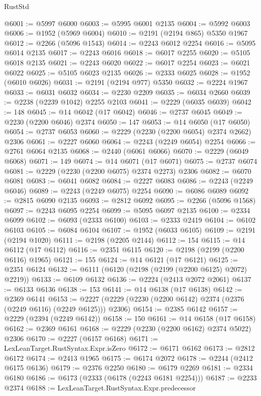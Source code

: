 \begin{lexlean}{RustStd}
\begin{coremodule}
@6001 := @5997 @6000
@6003 := @5995 @6001 @2135
@6004 := @5992 @6003
@6006 := @1952 (@5969 @6004)
@6010 := @2191 (@2194 @865) @5350 @1967
@6012 := @2266 (@5096 @1543)
@6014 := @2243 @6012 @2254
@6016 := @5095 @6014 @2135
@6017 := @2243 @6016
@6018 := @6017 @2255
@6020 := @5105 @6018 @2135
@6021 := @2243 @6020
@6022 := @6017 @2254
@6023 := @6021 @6022
@6025 := @5105 @6023 @2135
@6026 := @2333 @6025
@6028 := @1952 (@6010 @6026)
@6031 := @2191 (@2194 @977) @5350
@6032 := @2224 @1967
@6033 := @6031 @6032
@6034 := @2230 @2209
@6035 := @6034 @2660
@6039 := @2238 (@2239 @1042) @2255 @2103
@6041 := @2229 (@6035 @6039)
@6042 := 148
@6045 := @14 @6042 (@17 @6042)
@6046 := @2737 @6045
@6049 := @2230 (@2200 @6046) @2374
@6050 := 147
@6053 := @14 @6050 (@17 @6050)
@6054 := @2737 @6053
@6060 := @2229 (@2230 (@2200 @6054) @2374 @2662) @2306
@6061 := @2227 @6060
@6064 := @2243 (@2249 @6054) @2254
@6066 := @2761 @6064 @2135
@6068 := @2440 (@6061 @6066)
@6070 := @2229 (@6049 @6068)
@6071 := 149
@6074 := @14 @6071 (@17 @6071)
@6075 := @2737 @6074
@6081 := @2229 (@2230 (@2200 @6075) @2374 @2273) @2306
@6082 := @6070 @6081
@6083 := @6041 @6082
@6084 := @2227 @6083
@6086 := @2243 (@2249 @6046)
@6089 := @2243 (@2249 @6075) @2254
@6090 := @6086 @6089
@6092 := @2815 @6090 @2135
@6093 := @2812 @6092
@6095 := @2266 (@5096 @1568)
@6097 := @2243 @6095 @2254
@6099 := @5095 @6097 @2135
@6100 := @2334 @6099
@6102 := @6093 (@2333 @6100)
@6103 := @2333 @2419
@6104 := @6102 @6103
@6105 := @6084 @6104
@6107 := @1952 (@6033 @6105)
@6109 := @2191 (@2194 @1020)
@6111 := @2198 (@2205 @2144)
@6112 := 154
@6115 := @14 @6112 (@17 @6112)
@6116 := @2351 @6115
@6120 := @2198 (@2199 (@2200 @6116) @1965)
@6121 := 155
@6124 := @14 @6121 (@17 @6121)
@6125 := @2351 @6124
@6132 := @6111 (@6120 (@2198 (@2199 (@2200 @6125) @2072) @2219))
@6133 := @6109 @6132
@6136 := @2224 (@2413 @2072 @2061)
@6137 := @6133 @6136
@6138 := 153
@6141 := @14 @6138 (@17 @6138)
@6142 := @2369 @6141
@6153 := @2227 (@2229 (@2230 (@2200 @6142) @2374 (@2376 (@2249 @6116) (@2249 @6125))) @2306)
@6154 := @2385 @6142
@6157 := @2229 (@2394 (@2249 @6142))
@6158 := 150
@6161 := @14 @6158 (@17 @6158)
@6162 := @2369 @6161
@6168 := @2229 (@2230 (@2200 @6162) @2374 @5022) @2306
@6170 := @2227 (@6157 @6168)
@6171 := LexLeanTarget.RustSyntax.Expr.isZero
@6172 := @6171 @6162
@6173 := @2812 @6172
@6174 := @2413 @1965
@6175 := @6174 @2072
@6178 := @2244 (@2412 @6175 @6136)
@6179 := @2376 @2250
@6180 := @6179 @2269
@6181 := @2334 @6180
@6186 := @6173 (@2333 (@6178 (@2243 @6181 @2254)))
@6187 := @2233 @2374
@6188 := LexLeanTarget.RustSyntax.Expr.predecessor

\end{coremodule}
\end{lexlean}
